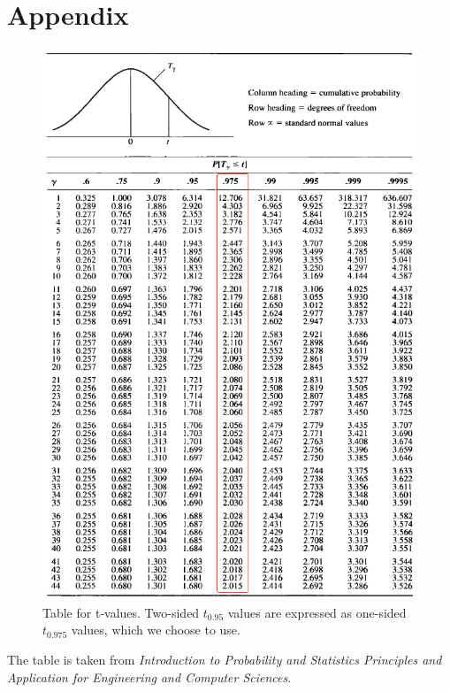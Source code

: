 \documentclass[12pt]{article}
\begin{document}
\section{Appendix}



\begin{figure}[H]
\centering
\includegraphics[width=13cm]{ttable.png}
\caption{Table for t-values. Two-sided $t_{0.95}$ values are expressed as one-sided $t_{0.975}$ values, which we choose to use. }

\end{figure}


The table is taken from \textit{Introduction to Probability and Statistics Principles and Application for Engineering and Computer Sciences}.
\end{document}
